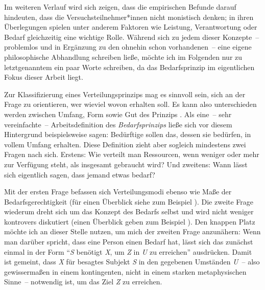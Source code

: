 \documentclass[justified,nobib,symmetric,twoside]{tufte-handout}
\begin{document}
Im weiteren Verlauf wird sich zeigen, dass die empirischen Befunde darauf hindeuten, dass die Versuchsteilnehmer*innen nicht monistisch denken; in ihren Überlegungen spielen unter anderem Faktoren wie Leistung, Verantwortung oder Bedarf gleichzeitig eine wichtige Rolle.
Während sich zu jedem dieser Konzepte~-- problemlos und in Ergänzung zu den ohnehin schon vorhandenen~-- eine eigene philosophische Abhandlung schreiben ließe, möchte ich im Folgenden nur zu letztgenanntem ein paar Worte schreiben, da das Bedarfsprinzip im eigentlichen Fokus dieser Arbeit liegt.

Zur Klassifizierung eines Verteilungsprinzips mag es sinnvoll sein, sich an der Frage zu orientieren, wer wieviel wovon erhalten soll.
Es kann also unterschieden werden zwischen Umfang, Form sowie Gut des Prinzips \citep{page_climate_2006,siebel_need_2020}.
Als eine~-- sehr vereinfachte~-- Arbeitsdefinition des \textit{Bedarfsprinzips} ließe sich vor diesem Hintergrund beispielsweise sagen: Bedürftige sollen das, dessen sie bedürfen, in vollem Umfang erhalten.
Diese Definition zieht aber sogleich mindestens zwei Fragen nach sich.
Erstens: Wie verteilt man Ressourcen, wenn weniger oder mehr zur Verfügung steht, als insgesamt gebraucht wird?
Und zweitens: Wann lässt sich eigentlich sagen, dass jemand etwas bedarf?

Mit der ersten Frage befassen sich Verteilungsmodi ebenso wie Maße der Bedarfsgerechtigkeit (für einen Überblick siehe zum Beispiel \cite{brock_needs_2019,siebel_measuring_nd}).
Die zweite Frage wiederum dreht sich um das Konzept des Bedarfs selbst und wird nicht weniger kontrovers diskutiert (einen Überblick geben zum Beispiel \cite{siebel_need_2020,poelzler_basic_2021}).
Den knappen Platz möchte ich an dieser Stelle nutzen, um mich der zweiten Frage anzunähern:
Wenn man darüber spricht, dass eine Person einen Bedarf hat, lässt sich das zunächst einmal in der Form \enquote{\textit{S} benötigt \textit{X}, um \textit{Z} in \textit{U} zu erreichen} ausdrücken.
Damit ist gemeint, dass \textit{X} für besagtes Subjekt \textit{S} in den gegebenen Umständen \textit{U}~-- also gewissermaßen in einem kontingenten, nicht in einem starken metaphysischen Sinne~-- notwendig ist, um das Ziel \textit{Z} zu erreichen.
\end{document}
